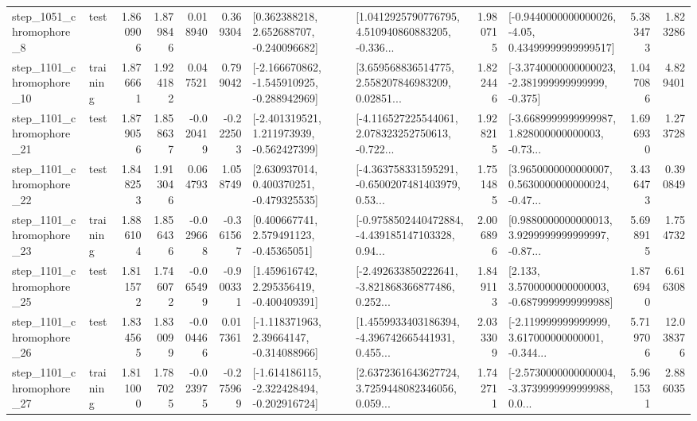 \begin{tabular}{llrrrrllrlrr}
  step\_1051\_chromophore\_8 &      test &      1.860906 &    1.879846 &      0.018940 &  0.369304 &    [0.362388218, 2.652688707, -0.240096682] &  [1.0412925790776795, 4.510940860883205, -0.336... &       1.980715 &  [-0.9440000000000026, -4.05, 0.43499999999999517] &            5.383473 &          1.823286 \\
 step\_1101\_chromophore\_10 &  training &      1.876661 &    1.924182 &      0.047521 &  0.799042 &  [-2.166670862, -1.545910925, -0.288942969] &  [3.659568836514775, 2.558207846983209, 0.02851... &       1.822446 &  [-3.3740000000000023, -2.381999999999999, -0.375] &            1.047086 &          4.829401 \\
 step\_1101\_chromophore\_21 &      test &      1.879056 &    1.858637 &     -0.020419 & -0.222503 &   [-2.401319521, 1.211973939, -0.562427399] &  [-4.116527225544061, 2.078323252750613, -0.722... &       1.928215 &  [-3.6689999999999987, 1.828000000000003, -0.73... &            1.696930 &          1.273728 \\
 step\_1101\_chromophore\_22 &      test &      1.848253 &    1.913046 &      0.064793 &  1.058749 &    [2.630937014, 0.400370251, -0.479325535] &  [-4.363758331595291, -0.6500207481403979, 0.53... &       1.751485 &  [3.9650000000000007, 0.5630000000000024, -0.47... &            3.436473 &          0.390849 \\
 step\_1101\_chromophore\_23 &  training &      1.886104 &    1.856436 &     -0.029668 & -0.361567 &     [0.400667741, 2.579491123, -0.45365051] &  [-0.9758502440472884, -4.439185147103328, 0.94... &       2.006896 &  [0.9880000000000013, 3.9299999999999997, -0.87... &            5.698915 &          1.754732 \\
 step\_1101\_chromophore\_25 &      test &      1.811572 &    1.746072 &     -0.065499 & -0.900331 &    [1.459616742, 2.295356419, -0.400409391] &  [-2.492633850222641, -3.821868366877486, 0.252... &       1.849113 &   [2.133, 3.5700000000000003, -0.6879999999999988] &            1.876940 &          6.616308 \\
 step\_1101\_chromophore\_26 &      test &      1.834565 &    1.830099 &     -0.004466 &  0.017361 &    [-1.118371963, 2.39664147, -0.314088966] &  [1.4559933403186394, -4.396742665441931, 0.455... &       2.033309 &  [-2.119999999999999, 3.617000000000001, -0.344... &            5.719706 &         12.038376 \\
 step\_1101\_chromophore\_27 &  training &      1.811000 &    1.787025 &     -0.023975 & -0.275969 &  [-1.614186115, -2.322428494, -0.202916724] &  [2.6372361643627724, 3.7259448082346056, 0.059... &       1.742711 &  [-2.5730000000000004, -3.3739999999999988, 0.0... &            5.961531 &          2.886035 \\

\end{tabular}
